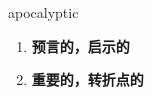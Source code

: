 
\begin{frame}
{\huge apocalyptic}
\begin{center}
\begin{enumerate}\Large
  \item \textbf{预言的，启示的}
  \item \textbf{重要的，转折点的}
\end{enumerate}
\end{center}
\end{frame}
